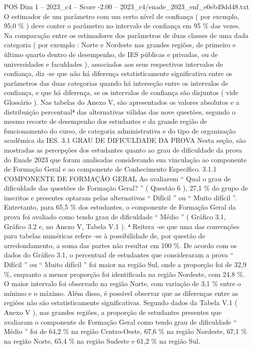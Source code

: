 \begin{textsample}{POS Dim 1 – 2023\_c4 – Score -2.00 – 2023\_c4/enade\_2023\_enf\_e0eb49dd48.txt}
O estimador de um parâmetro com um certo nível de confiança ( por exemplo, 95,0 \% ) deve conter o parâmetro no intervalo de confiança em 95 \% das vezes.
Na comparação entre os estimadores dos parâmetros de duas classes de uma dada categoria ( por exemplo : Norte e Nordeste nas grandes regiões, de primeiro e último quarto dentro de desempenho, de IES públicas e privadas, ou de universidades e faculdades ), associados aos seus respectivos intervalos de confiança, diz -se que não há diferença estatisticamente significativa entre os parâmetros das duas categorias quando há interseção entre os intervalos de confiança, e que há diferença, se os intervalos de confiança são disjuntos ( vide Glossário ).
Nas tabelas do Anexo V, são apresentados os valores absolutos e a distribuição percentual⁴ das alternativas válidas das nove questões, segundo o mesmo recorte de desempenho dos estudantes e da grande região de funcionamento do curso, de categoria administrativa e do tipo de organização acadêmica da IES. 3.1 GRAU DE DIFICULDADE DA PROVA Nesta seção, são mostradas as percepções dos estudantes quanto ao grau de dificuldade da prova do Enade 2023 que foram analisadas considerando sua vinculação ao componente de Formação Geral e ao componente de Conhecimento Específico. 3.1.1 COMPONENTE DE FORMAÇÃO GERAL Ao avaliarem “ Qual o grau de dificuldade das questões de Formação Geral? ” ( Questão 6 ), 27,1 \% do grupo de inscritos e presentes optaram pelas alternativas “ Difícil ” ou “ Muito difícil ”.
Entretanto, para 65,5 \% dos estudantes, o componente de Formação Geral da prova foi avaliado como tendo grau de dificuldade “ Médio ” ( Gráfico 3.1, Gráfico 3.2 e, no Anexo V, Tabela V.1 ). ⁴ Reitera -se que uma das convenções para tabelas numéricas refere -se à possibilidade de, por questão de arredondamento, a soma das partes não resultar em 100 \%.
De acordo com os dados do Gráfico 3.1, o percentual de estudantes que consideraram a prova “ Difícil ” ou “ Muito difícil ” foi maior na região Sul, onde a proporção foi de 32,9 \%, enquanto a menor proporção foi identificada na região Nordeste, com 24,8 \%.
O maior intervalo foi observado na região Norte, com variação de 3,1 \% entre o mínimo e o máximo.
Além disso, é possível observar que as diferenças entre as regiões não são estatisticamente significativas.
Segundo dados da Tabela V.1 ( Anexo V ), nas grandes regiões, a proporção de estudantes presentes que avaliaram o componente de Formação Geral como tendo grau de dificuldade “ Médio ” foi de 64,2 \% na região Centro-Oeste, 67,6 \% na região Nordeste, 67,1 \% na região Norte, 65,4 \% na região Sudeste e 61,2 \% na região Sul.

\end{textsample}
